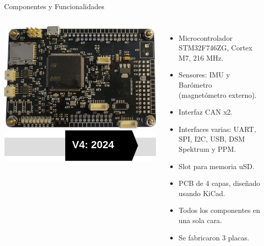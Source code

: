 \begin{frame}{Componentes y Funcionalidades}
	\begin{columns}
			\begin{center}
				\includegraphics[width=\textwidth]{img/Choriboard_IV.png}\\
				\vspace{0.6cm}
				\onslide<1->\includegraphics[width=\textwidth]{img/cosito_2_V4.png}
			\end{center}
			\begin{itemize}
				\item<3->Microcontrolador STM32F746ZG, Cortex M7, 216 MHz.
				\item<4->Sensores: IMU y Barómetro (magnetómetro externo).
				\item<5->Interfaz CAN x2.
				\item<6->Interfaces varias: UART, SPI, I2C, USB, DSM Spektrum y PPM.
				\item<7->Slot para memoria uSD.
				\item<8->PCB de 4 capas, diseñado usando KiCad.
				\item<9->Todos los componentes en una sola cara.
				\item<10->Se fabricaron 3 placas.
			\end{itemize}
	\end{columns}
\end{frame}

